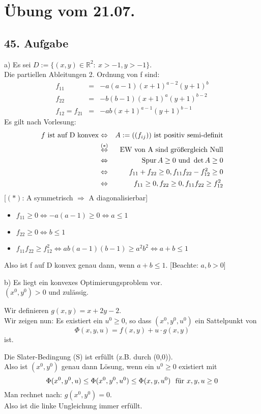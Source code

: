 \documentclass[a4paper,11pt,twoside,titlepage]{article}
\newcommand{\R}{{\mathbb R}}
\begin{document}
\newpage
\section{Übung vom 21.07.}

\subsection*{45. Aufgabe}
a) Es sei $D:=\{(x,y)\in\R^2:\ x>-1,y>-1\}$.\\
Die partiellen Ableitungen 2. Ordnung von f sind:
\begin{eqnarray*}
f_{11}&=&-a(a-1)(x+1)^{a-2}(y+1)^{b}\\
f_{22}&=&-b(b-1)(x+1)^{a}(y+1)^{b-2}\\
f_{12}=f_{21}&=&-ab(x+1)^{a-1}(y+1)^{b-1}\end{eqnarray*}
Es gilt nach Vorlesung:
\begin{eqnarray*}f\textnormal{ ist auf D konvex}&\Leftrightarrow&A:=((f_{ij}))\textnormal{ ist positiv semi-definit}\\
&\stackrel{(\ast)}{\Leftrightarrow}&\textnormal{EW von A sind größergleich Null}\\
&\Leftrightarrow&\operatorname{Spur}A\geq0 \textnormal{ und }\det A\geq0\\
&\Leftrightarrow& f_{11}+f_{22}\geq0,f_{11}f_{22}-f_{12}^2\geq0\\
&\Leftrightarrow&f_{11}\geq0,f_{22}\geq0,f_{11}f_{22}\geq f_{12}^2
\end{eqnarray*}
[$(\ast)$: A symmetrisch $\Rightarrow$ A diagonalisierbar]
\begin{itemize}
\item{$f_{11}\geq0\Leftrightarrow-a(a-1)\geq0\Leftrightarrow a\leq1$}
\item{$f_{22}\geq0\Leftrightarrow b\leq1$}
\item{$f_{11}f_{22}\geq f_{12}^2\Leftrightarrow ab(a-1)(b-1)\geq a^2b^2\Leftrightarrow a+b\leq1$}
\end{itemize}
Also ist f auf D konvex genau dann, wenn $a+b\leq 1$. [Beachte: $a,b>0$]

b) Es liegt ein konvexes Optimierungsproblem vor.\\
$(x^0,y^0)>0$ und zulässig.

Wir definieren $g(x,y)=x+2y-2$.\\
Wir zeigen nun: Es existiert ein $u^0\geq0$, so dass $(x^0,y^0,u^0)$ ein Sattelpunkt von
\[\Phi(x,y,u)=f(x,y)+u\cdot g(x,y)\]
ist.

Die Slater-Bedingung (S) ist erfüllt (z.B. durch (0,0)).\\
Also ist $(x^0,y^0)$ genau dann Lösung, wenn ein $u^0\geq 0$ existiert mit
\[\Phi(x^0,y^0,u)\leq \Phi(x^0,y^0,u^0)\leq \Phi(x,y,u^0)\ \ \textnormal{für }x,y,u\geq0\]
Man rechnet nach: $g(x^0,y^0)=0$.\\
Also ist die linke Ungleichung immer erfüllt.
\end{document}
